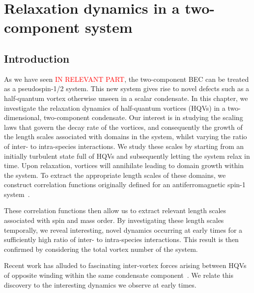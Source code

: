 \chapter{Relaxation dynamics in a two-component system}

\section{Introduction}
As we have seen \textcolor{red}{IN RELEVANT PART}, the two-component BEC can be 
treated as a pseudospin-1/2 system. 
This new system gives rise to novel defects such as a half-quantum vortex 
otherwise unseen in a scalar condensate. 
In this chapter, we investigate the relaxation dynamics of half-quantum vortices 
(HQVs) in a two-dimensional, two-component condensate. 
Our interest is in studying the scaling laws that govern the decay rate of the 
vortices, and consequently the growth of the length scales associated with 
domains in the system, whilst varying the ratio of inter- to intra-species 
interactions. 
We study these scales by starting from an initially turbulent state full of 
HQVs and subsequently letting the system relax in time. 
Upon relaxation, vortices will annihilate leading to domain growth within 
the system.
To extract the appropriate length scales of these domains, we construct 
correlation functions originally defined for an antiferromagnetic spin-1 
system~\cite{Symes2017}.

These correlation functions then allow us to extract relevant length scales 
associated with spin and mass order. 
By investigating these length scales temporally, we reveal interesting, 
novel dynamics occurring at early times for a sufficiently high ratio of 
inter- to intra-species interactions. 
This result is then confirmed by considering the total vortex number of the 
system. 
\par
Recent work has alluded to fascinating inter-vortex forces arising between HQVs 
of opposite winding within the same condensate 
component~\cite{Eto2011,Kasamatsu2016}.
We relate this discovery to the interesting 
dynamics we observe at early times.

